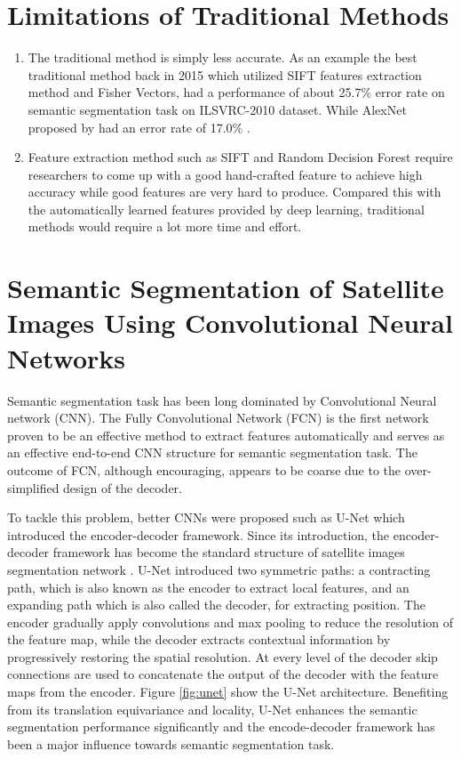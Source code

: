 \section{Limitations of Traditional Methods}
\begin{enumerate}
    \item The traditional method is simply less accurate. As an example the best traditional method back in 2015 which utilized SIFT features extraction method and Fisher Vectors, had a performance of about 25.7\% error rate on semantic segmentation task on ILSVRC-2010 dataset. While AlexNet proposed by \cite{alexnet} had an error rate of 17.0\% \cite{DBLP:journals/corr/Thoma16a}.
    \item  Feature extraction method such as SIFT and Random Decision Forest require researchers to come up with a good hand-crafted feature to achieve high accuracy while good features are very hard to produce. Compared this with the automatically learned features provided by deep learning, traditional methods would require a lot more time and effort.

\end{enumerate}


\section{Semantic Segmentation of Satellite Images Using Convolutional Neural Networks}

Semantic segmentation task has been long dominated by Convolutional Neural network (CNN). The Fully Convolutional Network (FCN) \cite{7298965} is the first network proven to be an effective method to extract features automatically and serves as an effective end-to-end CNN structure for semantic segmentation task. The outcome of FCN, although encouraging, appears to be coarse due to the over-simplified design of the decoder.

To tackle this problem, better CNNs were proposed such as U-Net \cite{unet} which  introduced the encoder-decoder framework. Since its introduction, the encoder-decoder framework has become the standard structure of satellite images segmentation network \cite{unetformer}. U-Net introduced two symmetric paths: a contracting path, which is also known as the encoder to extract local features, and an expanding path which is also called the decoder, for extracting position. The encoder gradually apply convolutions and max pooling to reduce the resolution of the feature map, while the decoder extracts contextual information by progressively restoring the spatial resolution. At every level of the decoder skip connections are used to concatenate the output of the decoder with the feature maps from the encoder. Figure \ref{fig:unet} show the U-Net architecture. Benefiting from its translation equivariance and locality, U-Net enhances the semantic segmentation performance significantly and the encode-decoder framework has been a major influence towards semantic segmentation task. 

